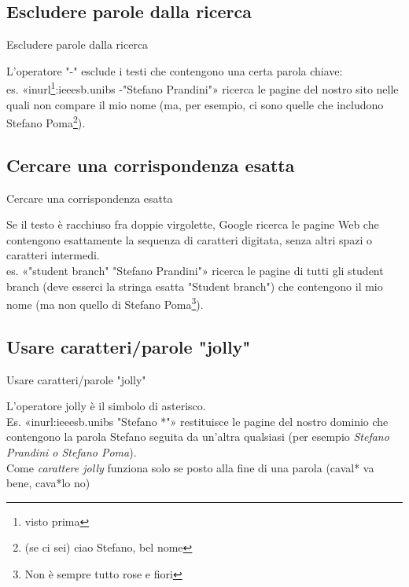 \documentclass{beamer}
\begin{document}
\subsection{Escludere parole dalla ricerca}
\begin{frame}{Escludere parole dalla ricerca}
\begin{block}{}
L'operatore "-" esclude i testi che contengono una certa parola chiave:\\ es. «inurl\footnote{visto prima}:ieeesb.unibs -"Stefano Prandini"» ricerca le pagine del nostro sito nelle quali non compare il mio nome (ma, per esempio, ci sono quelle che includono Stefano Poma\footnote{(se ci sei) ciao Stefano, bel nome}).
\end{block}
\end{frame}

\subsection{Cercare una corrispondenza esatta}
\begin{frame}{Cercare una corrispondenza esatta}
\begin{block}{}
Se il testo è racchiuso fra doppie virgolette, Google ricerca le pagine Web che contengono esattamente la sequenza di caratteri digitata, senza altri spazi o caratteri intermedi.\\ es. «"student branch" "Stefano Prandini"» ricerca le pagine di tutti gli student branch (deve esserci la stringa esatta "Student branch") che contengono il mio nome (ma non quello di Stefano Poma\footnote{Non è sempre tutto rose e fiori}).
\end{block}
\end{frame}

\subsection{Usare caratteri/parole "jolly"}
\begin{frame}{Usare caratteri/parole "jolly"}
\begin{block}{}
L'operatore jolly è il simbolo di asterisco.\\Es. «inurl:ieeesb.unibs "Stefano *"» restituisce le pagine del nostro dominio che contengono la parola Stefano seguita da un'altra qualsiasi (per esempio \textit{Stefano Prandini o Stefano Poma}).\\
Come \textit{carattere jolly} funziona solo se posto alla fine di una parola (caval* va bene, cava*lo no)
\end{block}
\end{frame}
\end{document}
